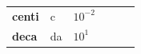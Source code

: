 {\begin{center}
\begin{xtabular*}{\mytablewidth}[t]{|p{10\mystarwidth}|p{10\mystarwidth}|p{10\mystarwidth}|p{10\mystarwidth}|p{10\mystarwidth}|p{10\mystarwidth}|}
    
        
                \textbf{centi}
               &
    
    
        c &
    
    
        
                \begin{math}{10}^{-2}\end{math}
     \tabularnewline{}
    
    
        
                \textbf{deca}
               &
    
    
        da &
    
    
        
                \begin{math}{10}^{1}\end{math}
               &
    
    
        

\end{xtabular*}
\end{center}}
